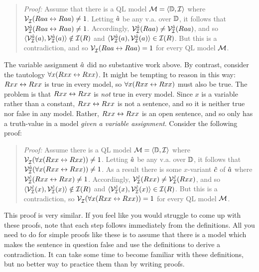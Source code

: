 \begin{quote}
\label{allmodels1}
  \textit{Proof:}
  Assume that there is a QL model $\mathcal{M}=\langle\mathbb{D},\mathcal{I}\rangle$ where $\mathcal{V}_{\mathcal{I}}^{}(Raa\leftrightarrow Raa)\neq 1$.
  Letting $\hat{a}$ be any v.a. over $\mathbb{D}$, it follows that $\mathcal{V}_{\mathcal{I}}^{\hat{a}}(Raa\leftrightarrow Raa)\neq 1$.
  Accordingly, $\mathcal{V}_{\mathcal{I}}^{\hat{a}}(Raa)\neq\mathcal{V}_{\mathcal{I}}^{\hat{a}}(Raa)$, and so $\langle\mathcal{V}_{\mathcal{I}}^{\hat{a}}(a),\mathcal{V}_{\mathcal{I}}^{\hat{a}}(a)\rangle\notin\mathcal{I}(R)$ and $\langle\mathcal{V}_{\mathcal{I}}^{\hat{a}}(a),\mathcal{V}_{\mathcal{I}}^{\hat{a}}(a)\rangle\in\mathcal{I}(R)$.
  But this is a contradiction, and so $\mathcal{V}_{\mathcal{I}}^{}(Raa\leftrightarrow Raa)=1$ for every QL model $\mathcal{M}$.
\end{quote}

The variable assignment $\hat{a}$ did no substantive work above. 
By contrast, consider the tautology $\forall x(Rxx\leftrightarrow Rxx)$.
It might be tempting to reason in this way: $Rxx\leftrightarrow Rxx$ is true in every model, so $\forall x(Rxx\leftrightarrow Rxx)$ must also be true.
The problem is that $Rxx\leftrightarrow Rxx$ is \emph{not} true in every model.
Since $x$ is a variable rather than a constant, $Rxx\leftrightarrow Rxx$ is not a sentence, and so it is neither true nor false in any model.
Rather, $Rxx\leftrightarrow Rxx$ is an open sentence, and so only has a truth-value in a model \textit{given a variable assignment}. 
Consider the following proof:

\begin{quote}
\label{allmodels2}
  \textit{Proof:}
  Assume there is a QL model $\mathcal{M}=\langle\mathbb{D},\mathcal{I}\rangle$ where $\mathcal{V}_{\mathcal{I}}^{}(\forall x(Rxx\leftrightarrow Rxx))\neq 1$.
  Letting $\hat{a}$ be any v.a. over $\mathbb{D}$, it follows that $\mathcal{V}_{\mathcal{I}}^{\hat{a}}(\forall x(Rxx\leftrightarrow Rxx))\neq 1$.
  As a result there is some $x$-variant $\hat{c}$ of $\hat{a}$ where $\mathcal{V}_{\mathcal{I}}^{\hat{c}}(Rxx\leftrightarrow Rxx)\neq 1$.
  Accordingly, $\mathcal{V}_{\mathcal{I}}^{\hat{c}}(Rxx)\neq\mathcal{V}_{\mathcal{I}}^{\hat{c}}(Rxx)$, and so $\langle\mathcal{V}_{\mathcal{I}}^{\hat{c}}(x),\mathcal{V}_{\mathcal{I}}^{\hat{c}}(x)\rangle\notin\mathcal{I}(R)$ and $\langle\mathcal{V}_{\mathcal{I}}^{\hat{c}}(x),\mathcal{V}_{\mathcal{I}}^{\hat{c}}(x)\rangle\in\mathcal{I}(R)$.
  But this is a contradiction, so $\mathcal{V}_{\mathcal{I}}^{}(\forall x(Rxx\leftrightarrow Rxx))=1$ for every QL model $\mathcal{M}$.
\end{quote}

This proof is very similar.
If you feel like you would struggle to come up with these proofs, note that each step follows immediately from the definitions.
All you need to do for simple proofs like these is to assume that there is a model which makes the sentence in question false and use the definitions to derive a contradiction.
It can take some time to become familiar with these definitions, but no better way to practice them than by writing proofs.


